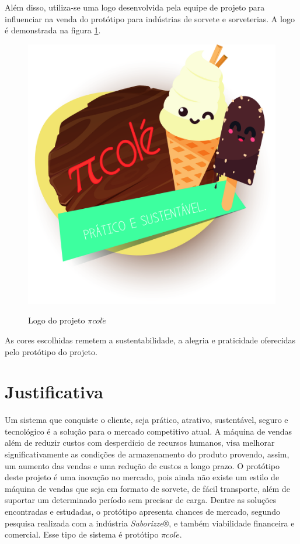 Além disso, utiliza-se uma logo desenvolvida pela equipe de projeto para influenciar na venda do protótipo para indústrias de sorvete e sorveterias. A logo é demonstrada na figura \ref{fig:logopicole}.

\begin{figure}[H]
	\centering
    \includegraphics[scale=0.2]{figuras/logo_picole}
    \label{fig:logopicole}
    \caption{Logo do projeto $\pi col\acute{e}$}
\end{figure}

As cores escolhidas remetem a sustentabilidade, a alegria e praticidade oferecidas pelo protótipo do projeto. 

\section{Justificativa}

Um sistema que conquiste o cliente, seja prático, atrativo, sustentável, seguro e tecnológico é a solução para o mercado competitivo atual.
A máquina de vendas além de reduzir custos com desperdício de recursos humanos, visa melhorar significativamente as condições de armazenamento do produto provendo, assim, um aumento das vendas e uma redução de custos a longo prazo.
O protótipo deste projeto é uma inovação no mercado, pois ainda não existe um estilo de máquina de vendas que seja em formato de sorvete, de fácil transporte, além de suportar um determinado período sem precisar de carga. 
Dentre as soluções encontradas e estudadas, o protótipo apresenta chances de mercado, segundo pesquisa realizada com a indústria \textit{ Saborizze}®, e também viabilidade financeira e comercial.
Esse tipo de sistema é protótipo $\pi col\acute{e}$.  

